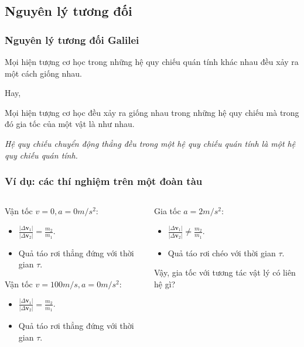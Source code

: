 \subsection{Nguyên lý tương đối}
\begin{frame}
    \frametitle{Nguyên lý tương đối Galilei}
    \begin{tcolorbox}[colback=blue!10, colframe=blue!50!black]
        Mọi hiện tượng cơ học trong những hệ quy chiếu quán tính khác nhau đều xảy ra một cách giống nhau.
    \end{tcolorbox}
    Hay,
     \begin{tcolorbox}[colback=blue!10, colframe=blue!50!black]
        Mọi hiện tượng cơ học đều xảy ra giống nhau trong những hệ quy chiếu mà trong đó gia tốc của một vật là như nhau.
    \end{tcolorbox}
    \emph{Hệ quy chiếu chuyển động thẳng đều trong một hệ quy chiếu quán tính là một hệ quy chiếu quán tính.}
\end{frame}
\begin{frame}
    \frametitle{Ví dụ: các thí nghiệm trên một đoàn tàu}
    \begin{columns}
        \begin{column}{0.5\textwidth}
            Vận tốc \(v=0, a=0m/s^2\):
            \begin{itemize}
                \item \(\frac{\lvert \Delta \mathbf{v}_1 \rvert}{\lvert\Delta\mathbf{v}_2\rvert}=\frac{m_2}{m_1}\).
                \item Quả táo rơi thẳng đứng với thời gian \(\tau\).
            \end{itemize}
            Vận tốc \(v=100m/s , a=0m/s^2\):
            \begin{itemize}
                \item \(\frac{\lvert \Delta \mathbf{v}_1 \rvert}{\lvert\Delta\mathbf{v}_2\rvert}=\frac{m_2}{m_1}\).
                \item Quả táo rơi thẳng đứng với thời gian \(\tau\).
            \end{itemize}
        \end{column}
          \begin{column}{0.5\textwidth}
            Gia tốc \(a=2m/s^2\):
            \begin{itemize}
                \item \(\frac{\lvert \Delta \mathbf{v}_1 \rvert}{\lvert\Delta\mathbf{v}_2\rvert}\neq\frac{m_2}{m_1}\).
                \item Quả táo rơi chéo với thời gian \(\tau\).
            \end{itemize}
            Vậy, gia tốc với tương tác vật lý có liên hệ gì?
        \end{column}
    \end{columns}
\end{frame}